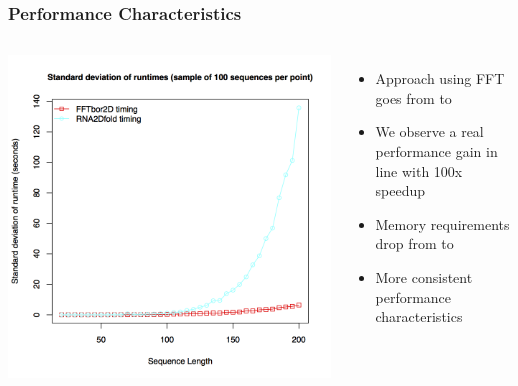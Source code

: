 \documentclass{beamer}
\begin{document}
\begin{frame}
  \frametitle{Performance Characteristics}
  \begin{columns}
  \includegraphics[width=\linewidth]{fft2dstdev.png}

  \begin{itemize}
  \item Approach using FFT goes from  to 
  \item We observe a real performance gain in line with 100x speedup
  \item Memory requirements drop from  to 
  \item More consistent performance characteristics
  \end{itemize}
  \end{columns}
\end{frame}
\end{document}
